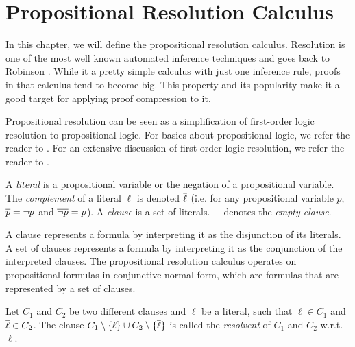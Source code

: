 \section{Propositional Resolution Calculus}
\label{sec:resolution}

In this chapter, we will define the propositional resolution calculus.
Resolution is one of the most well known automated inference techniques and goes back to Robinson \cite{Robinson1965}.
While it a pretty simple calculus with just one inference rule, proofs in that calculus tend to become big.
This property and its popularity make it a good target for applying proof compression to it.

Propositional resolution can be seen as a simplification of first-order logic resolution to propositional logic.
For basics about propositional logic, we refer the reader to \cite{Biere2009}.
For an extensive discussion of first-order logic resolution, we refer the reader to \cite{Leitsch1997}.

\begin{definition}

A \emph{literal} is a propositional variable or the negation of a propositional variable. 
The \emph{complement} of a literal $\ell$ is denoted $\overline{\ell}$ (i.e. for any propositional variable $p$,
$\overline{p} = \neg p$ and $\overline{\neg p} = p$). 
A \emph{clause} is a set of literals. 
$\bot$ denotes the \emph{empty clause}.

\end{definition}

A clause represents a formula by interpreting it as the disjunction of its literals.
A set of clauses represents a formula by interpreting it as the conjunction of the interpreted clauses.
The propositional resolution calculus operates on propositional formulas in conjunctive normal form, which are formulas that are represented by a set of clauses.

\begin{definition}[Resolvent]

Let $C_1$ and $C_2$ be two different clauses and $\ell$ be a literal, such that $\ell \in C_1$ and $\overline{\ell} \in C_2$.
The clause $C_1 \setminus \{\ell\} \cup C_2 \setminus \{\overline{\ell}\}$ is called the \emph{resolvent} of $C_1$ and $C_2$ w.r.t. $\ell$.

\end{definition}

